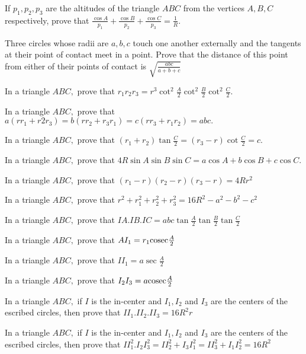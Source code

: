 \item If $p_1, p_2, p_3$ are the altitudes of the triangle $ABC$ from the vertices $A, B, C$ respectively, prove
   that $\frac{\cos A}{p_1} + \frac{\cos B}{p_2} + \frac{\cos C}{p_3} = \frac{1}{R}.$

\item Three circles whose radii are $a, b, c$ touch one another externally and the tangents at their point of contact meet in a
   point. Prove that the distance of this point from either of their points of contact is $\sqrt{\frac{abc}{a + b + c}}$

\item In a triangle $ABC,$ prove that $r_1r_2r_3 = r^3\cot^2\frac{A}{2}\cot^2\frac{B}{2}\cot^2\frac{C}{2}.$

\item In a triangle $ABC,$ prove that $a(rr_1 + r2r_3) = b(rr_2 + r_3r_1) = c(rr_3 + r_1r_2) = abc.$

\item In a triangle $ABC,$ prove that $(r_1 + r_2)\tan\frac{C}{2} = (r_3 - r)\cot\frac{C}{2} = c.$

\item In a triangle $ABC,$ prove that $4R\sin A\sin B\sin C = a\cos A + b\cos B + c\cos C.$

\item In a triangle $ABC,$ prove that $(r_1 - r)(r_2 - r)(r_3 - r) = 4Rr^2$

\item In a triangle $ABC,$ prove that $r^2 + r_1^2 + r_2^2 + r_3^2 = 16R^2 - a^2 - b^2 - c^2$

\item In a triangle $ABC,$ prove that $IA. IB. IC = abc\tan\frac{A}{2}\tan\frac{B}{2}\tan\frac{C}{2}$

\item In a triangle $ABC,$ prove that $AI_1 = r_1{\rm cosec}\frac{A}{2}$

\item In a triangle $ABC,$ prove that $II_1 = a\sec\frac{A}{2}$

\item In a triangle $ABC,$ prove that $I_2I_3 = a{\rm cosec}\frac{A}{2}$

\item In a triangle $ABC,$ if $I$ is the in-center and $I_1, I_2$ and $I_3$ are the centers of the escribed
   circles, then prove that $II_1.II_2.II_3 = 16R^2r$

\item In a triangle $ABC,$ if $I$ is the in-center and $I_1, I_2$ and $I_3$ are the centers of the escribed
   circles, then prove that $II_1^2.I_2I_3^2 = II_2^2 + I_3I_1^2 = II_3^2 + I_1I_2^2 = 16R^2$

